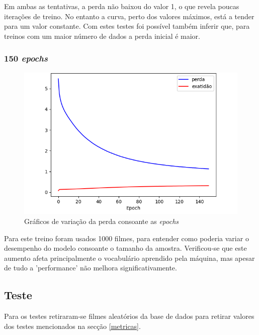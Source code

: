 \documentclass{article}
\begin{document}
Em ambas as tentativas, a perda não baixou do valor 1, o que revela poucas iterações de treino. No entanto a curva, perto dos valores máximos, está a tender para um valor constante. Com estes testes foi possível também inferir que, para treinos com um maior número de dados a perda inicial é maior.

\subsubsection{150 \textit{epochs}}
\begin{figure}[h]
    \centering
    \includegraphics[scale=0.4]{150epochs1000movies}
    \caption{Gráficos de variação da perda consoante as \textit{epochs}}
    \label{150epochs}
\end{figure}

Para este treino foram usados 1000 filmes, para entender como poderia variar o desempenho do modelo consoante o tamanho da amostra. Verificou-se que este aumento afeta principalmente o vocabulário aprendido pela máquina, mas apesar de tudo a 'performance' não melhora significativamente.

\subsection{Teste}

Para os testes retiraram-se filmes aleatórios da base de dados para retirar valores dos testes mencionados na secção \ref{metricas}. 
\end{document}
